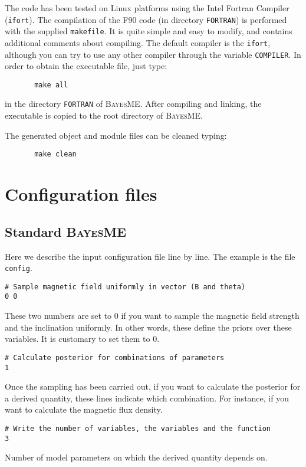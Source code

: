 \documentclass[12pt]{article}
\def\B{\textsc{BayesME}}
\begin{document}
The code has been tested on Linux platforms using the Intel Fortran
Compiler (\texttt{ifort}). The compilation 
of the F90 code (in directory \texttt{FORTRAN}) is performed
with the supplied \texttt{makefile}. It is quite simple and easy to modify, and
contains additional comments about compiling. The
default compiler is the \texttt{ifort}, although you can try to use any other
compiler through the variable \texttt{COMPILER}. In order to obtain the executable file, just type:
\begin{verbatim}
       make all
\end{verbatim}
in the directory \texttt{FORTRAN} of \B. After compiling and linking, the executable is copied to the root directory of
\B.

The generated object and module files can be cleaned typing:
\begin{verbatim}
       make clean
\end{verbatim}

\section{Configuration files}
\subsection{Standard \B}
Here we describe the input configuration file line by line. The example
is the file \texttt{config}.

\begin{verbatim}
# Sample magnetic field uniformly in vector (B and theta)
0 0
\end{verbatim}
These two numbers are set to 0 if you want to sample the magnetic field
strength and the inclination uniformly. In other words, these define the
priors over these variables. It is customary to set them to 0.

\begin{verbatim}
# Calculate posterior for combinations of parameters
1
\end{verbatim}
Once the sampling has been carried out, if you want to calculate
the posterior for a derived quantity, these lines indicate which
combination. For instance, if you want to calculate the magnetic
flux density.

\begin{verbatim}
# Write the number of variables, the variables and the function
3 
\end{verbatim}
Number of model parameters on which the derived quantity depends on.
\end{document}
